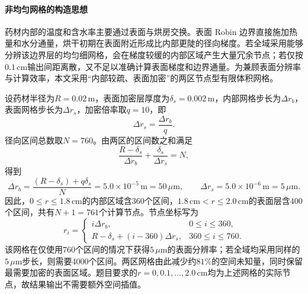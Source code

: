 \documentclass[withoutpreface,bwprint]{cumcmthesis}
\begin{document}
\paragraph{非均匀网格的构造思想}
药材内部的温度和含水率主要通过表面与烘房交换。表面 Robin 边界直接施加热量和水分通量，烘干初期在表面附近形成比内部更陡的径向梯度。若全域采用能够分辨该边界层的均匀细网格，会在梯度较缓的内部区域产生大量冗余节点；若仅按$0.1\,\mathrm{cm}$输出间距离散，又不足以准确计算表面梯度和边界通量。为兼顾表面分辨率与计算效率，本文采用“内部较疏、表面加密”的两区节点型有限体积网格。

设药材半径为$R=0.02\,\mathrm{m}$，表面加密层厚度为$\delta_s=0.002\,\mathrm{m}$，内部网格步长为$\Delta r_b$，表面网格步长为$\Delta r_s$，加密倍率取$q=10$，即
\begin{equation}
\Delta r_s=\frac{\Delta r_b}{q}.
\label{eq:q2-grid-ratio}
\end{equation}
径向区间总数取$N=760$。由两区的区间数之和满足
\begin{equation}
\frac{R-\delta_s}{\Delta r_b}
+
\frac{\delta_s}{\Delta r_s}
=N,
\label{eq:q2-grid-count}
\end{equation}
得到
\begin{equation}
\Delta r_b
=
\frac{(R-\delta_s)+q\delta_s}{N}
=5.0\times10^{-5}\,\mathrm{m}
=50\,\mu\mathrm{m},
\qquad
\Delta r_s
=5.0\times10^{-6}\,\mathrm{m}
=5\,\mu\mathrm{m}.
\label{eq:q2-grid-steps}
\end{equation}
因此，$0\le r\le1.8\,\mathrm{cm}$的内部区域含$360$个区间，$1.8\,\mathrm{cm}<r\le2.0\,\mathrm{cm}$的表面层含$400$个区间，共有$N+1=761$个计算节点。节点坐标写为
\begin{equation}
r_i=
\begin{cases}
i\Delta r_b,
&0\le i\le360,\\
R-\delta_s+(i-360)\Delta r_s,
&360\le i\le760.
\end{cases}
\label{eq:q2-grid-nodes}
\end{equation}
该网格在仅使用$760$个区间的情况下获得$5\,\mu\mathrm{m}$的表面分辨率；若全域均采用同样的$5\,\mu\mathrm{m}$步长，则需要$4000$个区间。两区网格由此减少约$81\%$的空间未知量，同时保留最需要加密的表面区域。题目要求的$r=0,0.1,\ldots,2.0\,\mathrm{cm}$均为上述网格的实际节点，故结果输出不需要额外空间插值。
\end{document}
